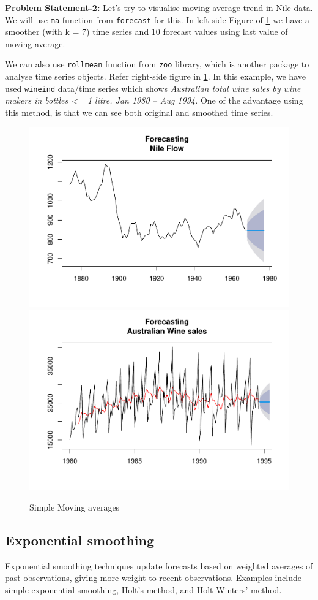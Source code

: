 \documentclass[
]{book}
\begin{document}
\textbf{Problem Statement-2:} Let's try to visualise moving average trend in Nile data. We will use \texttt{ma} function from \texttt{forecast} for this. In left side Figure of \ref{fig:ma1} we have a smoother (with k = 7) time series and 10 forecast values using last value of moving average.

We can also use \texttt{rollmean} function from \texttt{zoo} library, which is another package to analyse time series objects. Refer right-side figure in \ref{fig:ma1}. In this example, we have used \texttt{wineind} data/time series which shows \emph{Australian total wine sales by wine makers in bottles \textless= 1 litre. Jan 1980 -- Aug 1994.} One of the advantage using this method, is that we can see both original and smoothed time series.

\begin{figure}

{\centering \includegraphics[width=0.48\linewidth]{DauR_files/figure-latex/ma1-1} \includegraphics[width=0.48\linewidth]{DauR_files/figure-latex/ma1-2} 

}

\caption{Simple Moving averages}\label{fig:ma1}
\end{figure}

\hypertarget{exponential-smoothing}{%
\subsection{Exponential smoothing}\label{exponential-smoothing}}

Exponential smoothing techniques update forecasts based on weighted averages of past observations, giving more weight to recent observations. Examples include simple exponential smoothing, Holt's method, and Holt-Winters' method.
\end{document}
